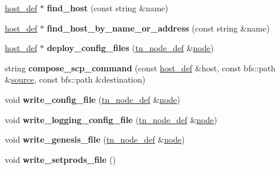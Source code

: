 \begin{DoxyCompactItemize}
\item 
\mbox{\label{structlauncher__def_ad4f922524a20063f61dfe6e9b3ebb0f5}} 
\mbox{\hyperlink{classhost__def}{host\+\_\+def}} $\ast$ {\bfseries find\+\_\+host} (const string \&name)
\item 
\mbox{\label{structlauncher__def_a3f52c46eb6f3592d0f19d5d8c1be5ed8}} 
\mbox{\hyperlink{classhost__def}{host\+\_\+def}} $\ast$ {\bfseries find\+\_\+host\+\_\+by\+\_\+name\+\_\+or\+\_\+address} (const string \&name)
\item 
\mbox{\label{structlauncher__def_a5b8462aec95e05816386f8f8ba35900a}} 
\mbox{\hyperlink{classhost__def}{host\+\_\+def}} $\ast$ {\bfseries deploy\+\_\+config\+\_\+files} (\mbox{\hyperlink{classtn__node__def}{tn\+\_\+node\+\_\+def}} \&\mbox{\hyperlink{structnode}{node}})
\item 
\mbox{\label{structlauncher__def_a2762b394d1c15e89b4a094fbb2115126}} 
string {\bfseries compose\+\_\+scp\+\_\+command} (const \mbox{\hyperlink{classhost__def}{host\+\_\+def}} \&host, const bfs\+::path \&\mbox{\hyperlink{structsource}{source}}, const bfs\+::path \&destination)
\item 
\mbox{\label{structlauncher__def_afab86712c24b14b123f859ec0ae1511c}} 
void {\bfseries write\+\_\+config\+\_\+file} (\mbox{\hyperlink{classtn__node__def}{tn\+\_\+node\+\_\+def}} \&\mbox{\hyperlink{structnode}{node}})
\item 
\mbox{\label{structlauncher__def_a67e91c13bd8b19d76efc5facba90b90f}} 
void {\bfseries write\+\_\+logging\+\_\+config\+\_\+file} (\mbox{\hyperlink{classtn__node__def}{tn\+\_\+node\+\_\+def}} \&\mbox{\hyperlink{structnode}{node}})
\item 
\mbox{\label{structlauncher__def_a6d1727a1ea8e7560df911855c1021ac6}} 
void {\bfseries write\+\_\+genesis\+\_\+file} (\mbox{\hyperlink{classtn__node__def}{tn\+\_\+node\+\_\+def}} \&\mbox{\hyperlink{structnode}{node}})
\item 
\mbox{\label{structlauncher__def_a1f0bbc8e52a2761b7ae2bb56e73e0f85}} 
void {\bfseries write\+\_\+setprods\+\_\+file} ()

\end{DoxyCompactItemize}
